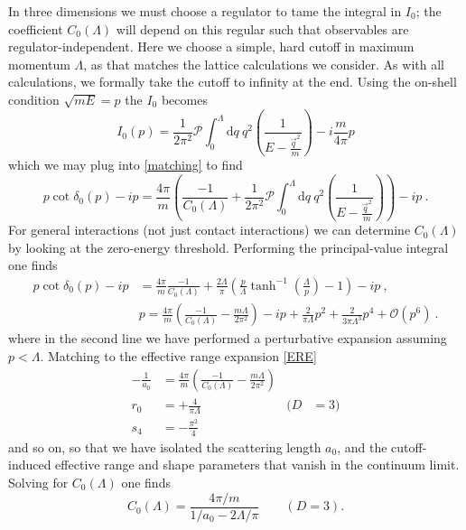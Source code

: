 In three dimensions we must choose a regulator to tame the integral in $I_0$; the coefficient $C_0(\Lambda)$ will depend on this regular such that observables are regulator-independent.  Here we choose a simple, hard cutoff in maximum momentum $\Lambda$, as that matches the lattice calculations we consider.  As with all calculations, we formally take the cutoff to infinity at the end.
Using the on-shell condition $\sqrt{mE}=p$ the $I_0$ becomes
\begin{equation}
    I_0(p) = \frac{1}{2\pi^2}\mathcal{P}\int_0^\Lambda  \mathrm { d } q \ q^2 \left( \frac { 1 } { E - \frac{\vec{q}^2}{m} } \right)
-i\frac{m}{4\pi}p
\end{equation}
which we may plug into \eqref{matching} to find
\begin{equation}
    p\cot \delta_0(p)-ip=\frac{4\pi}{m}\left(\frac{-1}{C_0(\Lambda)}+\frac{1}{2\pi^2}\mathcal{P}\int_0^\Lambda  \mathrm { d } q \ q^2 \left( \frac { 1 } { E - \frac{\vec{q}^2}{m} } \right)\right)-ip\ .
\end{equation}
For general interactions (not just contact interactions) we can determine $C_0(\Lambda)$ by looking at the zero-energy threshold.  Performing the principal-value integral one finds
\begin{align}
    p\cot \delta_0(p)-ip
    &=
    \frac{4\pi}{m}\frac{-1}{C_0(\Lambda)}+\frac{2\Lambda}{\pi} \left(\frac{p}{\Lambda} \tanh ^{-1}\left(\frac{\Lambda }{p}\right)-1 \right)-ip\ ,
    \\
    &p=\frac{4\pi}{m}\left(\frac{-1}{C_0(\Lambda)}-\frac{m\Lambda}{2\pi^2}\right)-ip+\frac{2}{\pi\Lambda}p^2+\frac{2}{3\pi\Lambda^3}p^4+\mathcal{O}(p^6)\ .
\end{align}
where in the second line we have performed a perturbative expansion assuming $p<\Lambda$.  Matching to the effective range expansion \eqref{ERE}
\begin{align}
    -\frac{1}{a_0} &= \frac{4\pi}{m}\left( \frac{-1}{C_0(\Lambda)}-\frac{m\Lambda}{2\pi^2}\right)
    \nonumber
    \\
    r_0 &= +\frac{4}{\pi \Lambda}   &
    (D   &= 3)
    \\
    \nonumber
    s_4 &= -\frac{\pi^2}{4}
\end{align}
and so on, so that we have isolated the scattering length $a_0$, and the cutoff-induced effective range and shape parameters that vanish in the continuum limit.
Solving for $C_0(\Lambda)$ one finds
\begin{equation}
    C_0(\Lambda) = \frac{4\pi/m}{1/a_0 - 2\Lambda/\pi}  \quad\quad (D=3).
\end{equation}

